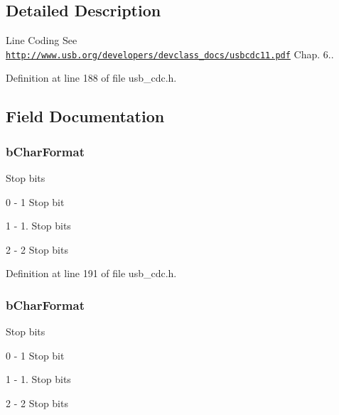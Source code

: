 \subsection{Detailed Description}
Line Coding See \href{http://www.usb.org/developers/devclass_docs/usbcdc11.pdf}{\tt http\-://www.\-usb.\-org/developers/devclass\-\_\-docs/usbcdc11.\-pdf} Chap. 6.. 

Definition at line 188 of file usb\-\_\-cdc.\-h.



\subsection{Field Documentation}
\hypertarget{struct_u_s_b___c_d_c___line___coding_a979573baf34aef2377f42c7457d234b0}{
\subsubsection[{b\-Char\-Format}]{ b\-Char\-Format}}\label{struct_u_s_b___c_d_c___line___coding_a979573baf34aef2377f42c7457d234b0}
Stop bits
\begin{DoxyItemize}
\item 0 -\/ 1 Stop bit
\item 1 -\/ 1. Stop bits
\item 2 -\/ 2 Stop bits
\end{DoxyItemize}

Definition at line 191 of file usb\-\_\-cdc.\-h.

\hypertarget{struct_u_s_b___c_d_c___line___coding_a4827b9804ae59af672c22c8f30c3b357}{
\subsubsection[{b\-Char\-Format}]{ b\-Char\-Format}}\label{struct_u_s_b___c_d_c___line___coding_a4827b9804ae59af672c22c8f30c3b357}
Stop bits
\begin{DoxyItemize}
\item 0 -\/ 1 Stop bit
\item 1 -\/ 1. Stop bits
\item 2 -\/ 2 Stop bits
\end{DoxyItemize}

